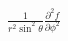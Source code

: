 \documentclass[preview]{standalone}
\begin{document}
\begin{align*}
\frac{1}{r^2 \sin^2\theta} \frac{\partial^2 f}{\partial \phi^2}
\end{align*}
\end{document}
